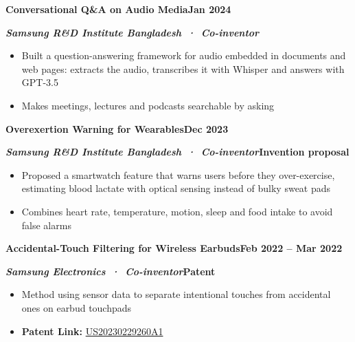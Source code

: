 \documentclass[10pt,letterpaper]{article}
\newcommand{\head}[2]{\Needspace{6\baselineskip}\textbf{#1}\hfill\textbf{#2}\par}
\newcommand{\sub}[2]{\textbf{\textit{#1}}\hfill\textbf{#2}\par}
\newcommand{\gap}{\vspace{3pt}}
\begin{document}
\gap
\head{Conversational Q\&A on Audio Media}{Jan 2024}
\sub{Samsung R\&D Institute Bangladesh \,·\, Co-inventor}{}
\begin{itemize}
  \item Built a question-answering framework for audio embedded in documents and web pages: extracts the audio, transcribes it with Whisper and answers with GPT-3.5
  \item Makes meetings, lectures and podcasts searchable by asking
\end{itemize}
\gap
\head{Overexertion Warning for Wearables}{Dec 2023}
\sub{Samsung R\&D Institute Bangladesh \,·\, Co-inventor}{Invention proposal}
\begin{itemize}
  \item Proposed a smartwatch feature that warns users before they over-exercise, estimating blood lactate with optical sensing instead of bulky sweat pads
  \item Combines heart rate, temperature, motion, sleep and food intake to avoid false alarms
\end{itemize}
\gap
\head{Accidental-Touch Filtering for Wireless Earbuds}{Feb 2022 -- Mar 2022}
\sub{Samsung Electronics \,·\, Co-inventor}{Patent}
\begin{itemize}
  \item Method using sensor data to separate intentional touches from accidental ones on earbud touchpads
  \item \textbf{Patent Link:} \href{https://patents.google.com/patent/US20230229260A1/en}{US20230229260A1}
\end{itemize}

\end{document}
